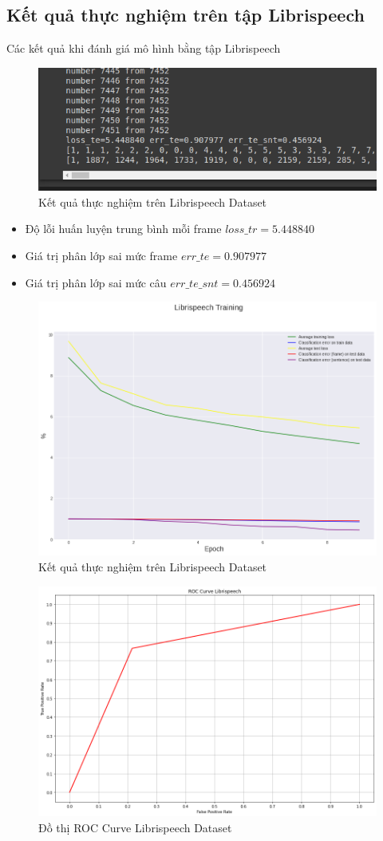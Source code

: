 \documentclass{article}
\begin{document}
	\subsection{Kết quả thực nghiệm trên tập Librispeech}
	Các kết quả khi đánh giá mô hình bằng tập Librispeech
	\begin{figure}[H]
		\centering
		\includegraphics[width=.75\textwidth]{result/evaluate_result_libris.png}
		\caption{Kết quả thực nghiệm trên Librispeech Dataset}
		\label{fig:writing-thesis}
	\end{figure}
	\begin{itemize}
		\item Độ lỗi huấn luyện trung bình mỗi frame $loss\_tr=5.448840$
		\item Giá trị phân lớp sai mức frame $err\_te=0.907977$
		\item Giá trị phân lớp sai mức câu $err\_te\_snt =0.456924$
	\end{itemize}
	\begin{figure}[H]
		\centering
		\includegraphics[width=.75\textwidth]{result/sincnet_librispeech_plot.png}
		\caption{Kết quả thực nghiệm trên Librispeech Dataset}
		\label{fig:writing-thesis}
	\end{figure}
	\begin{figure}[H]
		\centering
		\includegraphics[width=.75\textwidth]{result/roc_curve_librispeech.png}
		\caption{Đồ thị ROC Curve Librispeech Dataset}
		\label{fig:writing-thesis}
	\end{figure}
\end{document}
